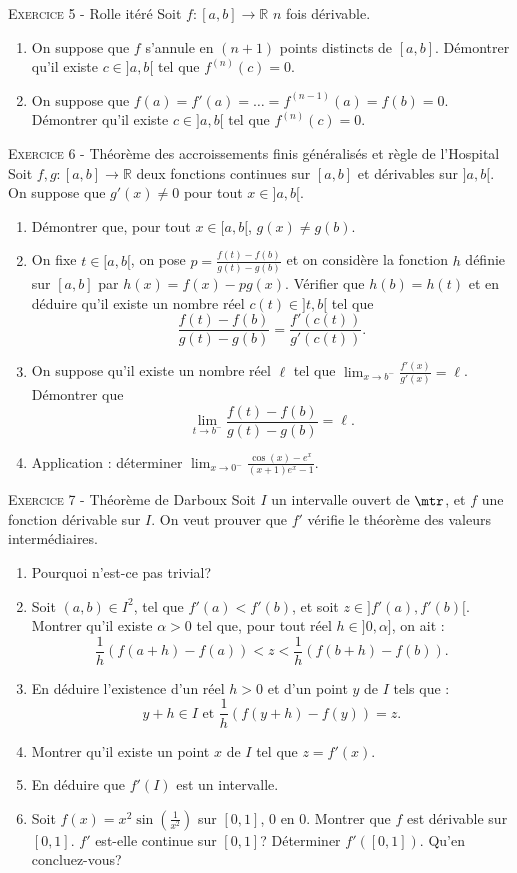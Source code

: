 

\vskip0.3cm\noindent\textsc{Exercice 5} - Rolle itéré
\vskip0.2cm
Soit $f:[a,b]\to\mathbb R$ $n$ fois dérivable.
\begin{enumerate}
\item On suppose que $f$ s'annule en $(n+1)$ points distincts de $[a,b]$. Démontrer qu'il existe $c\in ]a,b[$ tel que $f^{(n)}(c)=0$.
\item On suppose que $f(a)=f'(a)=\dots=f^{(n-1)}(a)=f(b)=0$. Démontrer qu'il existe $c\in ]a,b[$ tel que $f^{(n)}(c)=0$.
\end{enumerate}




\vskip0.3cm\noindent\textsc{Exercice 6} - Théorème des accroissements finis généralisés et règle de l'Hospital
\vskip0.2cm
Soit $f,g:[a,b]\to\mathbb R$ deux fonctions continues sur $[a,b]$ et dérivables sur $]a,b[$. 
On suppose que $g'(x)\neq 0$ pour tout $x\in ]a,b[$.
\begin{enumerate}
\item Démontrer que, pour tout $x\in [a,b[$,  $g(x)\neq g(b)$.
\item On fixe $t\in[a,b[$, on pose $p=\frac{f(t)-f(b)}{g(t)-g(b)}$ et on considère la fonction $h$ définie sur $[a,b]$ par $h(x)=f(x)-p g(x)$. Vérifier que $h(b)=h(t)$ et en déduire qu'il existe un nombre réel $c(t)\in ]t,b[$ tel que 
$$\frac{f(t)-f(b)}{g(t)-g(b)}=\frac{f'(c(t))}{g'(c(t))}.$$
\item On suppose qu'il existe un nombre réel $\ell$ tel que $\lim_{x\to b^-}\frac{f'(x)}{g'(x)}=\ell$. 
Démontrer que 
$$\lim_{t\to b^-}\frac{f(t)-f(b)}{g(t)-g(b)}=\ell.$$
\item Application : déterminer $\lim_{x\to 0^-}\frac{\cos(x)-e^x}{(x+1)e^x-1}$.
\end{enumerate}




\vskip0.3cm\noindent\textsc{Exercice 7} - Théorème de Darboux
\vskip0.2cm
Soit $I$ un intervalle ouvert de $\mtr$, et $f$ une fonction dérivable sur $I$. On veut prouver que $f'$ vérifie le théorème des valeurs intermédiaires.
\begin{enumerate}
\item Pourquoi n'est-ce pas trivial?
\item Soit $(a,b)\in I^2$, tel que $f'(a)<f'(b)$, et soit $z\in]f'(a),f'(b)[$. Montrer qu'il existe $\alpha>0$ tel que, pour tout réel $h\in]0,\alpha]$, on ait :
$$\frac{1}{h}\left(f(a+h)-f(a)\right)<z<\frac{1}{h}\left(f(b+h)-f(b)\right).$$
\item En déduire l'existence d'un réel $h>0$ et d'un point $y$ de $I$ tels que :
$$y+h\in I \textrm{ et }\frac{1}{h}\left(f(y+h)-f(y)\right)=z.$$
\item Montrer qu'il existe un point $x$ de $I$ tel que $z=f'(x)$.
\item En déduire que $f'(I)$ est un intervalle.
\item Soit $f(x)=x^2\sin\left(\frac{1}{x^2}\right)$ sur $[0,1]$, $0$ en $0$. Montrer que $f$ est dérivable sur $[0,1]$. $f'$ est-elle continue sur $[0,1]$? Déterminer $f'([0,1])$. Qu'en concluez-vous?
\end{enumerate}


